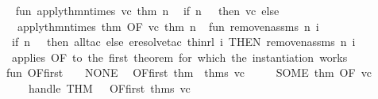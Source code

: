 \begin{isabellebody}
{\isacartoucheclose}\isanewline
\isanewline
{}\isamarkupfalse%
\ {\isacartoucheopen}\isanewline
fun\ apply{\isacharunderscore}{\kern0pt}thm{\isacharunderscore}{\kern0pt}n{\isacharunderscore}{\kern0pt}times\ vc\ thm\ n\ {\isacharequal}{\kern0pt}\isanewline
\ {\isacharparenleft}{\kern0pt}if\ n\ {\isacharless}{\kern0pt}{\isacharequal}{\kern0pt}\ {}\ then\ vc\ else\ \isanewline
\ \ {\isacharparenleft}{\kern0pt}apply{\isacharunderscore}{\kern0pt}thm{\isacharunderscore}{\kern0pt}n{\isacharunderscore}{\kern0pt}times\ {\isacharparenleft}{\kern0pt}thm\ OF\ {\isacharbrackleft}{\kern0pt}vc{\isacharbrackright}{\kern0pt}{\isacharparenright}{\kern0pt}\ thm\ {\isacharparenleft}{\kern0pt}n{\isacharminus}{\kern0pt}{}{\isacharparenright}{\kern0pt}{\isacharparenright}{\kern0pt}\isanewline
\ {\isacharparenright}{\kern0pt}\isanewline
\isanewline
fun\ remove{\isacharunderscore}{\kern0pt}n{\isacharunderscore}{\kern0pt}assms\ n\ i\ {\isacharequal}{\kern0pt}\ \isanewline
\ {\isacharparenleft}{\kern0pt}if\ n\ {\isacharless}{\kern0pt}{\isacharequal}{\kern0pt}\ {}\ then\ all{\isacharunderscore}{\kern0pt}tac\ else\ eresolve{}{\isacharunderscore}{\kern0pt}tac\ {\isacharbrackleft}{\kern0pt}thin{\isacharunderscore}{\kern0pt}rl{\isacharbrackright}{\kern0pt}\ i\ THEN\ remove{\isacharunderscore}{\kern0pt}n{\isacharunderscore}{\kern0pt}assms\ {\isacharparenleft}{\kern0pt}n{\isacharminus}{\kern0pt}{}{\isacharparenright}{\kern0pt}\ i{\isacharparenright}{\kern0pt}\isanewline
\isanewline
{\isacharparenleft}{\kern0pt}{\isacharasterisk}{\kern0pt}\ applies\ {\isachardoublequote}{\kern0pt}OF{\isachardoublequote}{\kern0pt}\ to\ the\ first\ theorem\ for\ which\ the\ instantiation\ works\ {\isacharasterisk}{\kern0pt}{\isacharparenright}{\kern0pt}\isanewline
fun\ OF{\isacharunderscore}{\kern0pt}first\ {\isacharbrackleft}{\kern0pt}{\isacharbrackright}{\kern0pt}\ {\isacharunderscore}{\kern0pt}\ {\isacharequal}{\kern0pt}\ NONE\isanewline
\ {\isacharbar}{\kern0pt}\ OF{\isacharunderscore}{\kern0pt}first\ {\isacharparenleft}{\kern0pt}thm\ {\isacharcolon}{\kern0pt}{\isacharcolon}{\kern0pt}\ thms{\isacharparenright}{\kern0pt}\ vc\ {\isacharequal}{\kern0pt}\isanewline
\ \ \ \ {\isacharparenleft}{\kern0pt}SOME\ {\isacharparenleft}{\kern0pt}thm\ OF\ {\isacharbrackleft}{\kern0pt}vc{\isacharbrackright}{\kern0pt}{\isacharparenright}{\kern0pt}{\isacharparenright}{\kern0pt}\isanewline
\ \ \ \ handle\ THM\ {\isacharunderscore}{\kern0pt}\ {\isacharequal}{\kern0pt}{\isachargreater}{\kern0pt}\ OF{\isacharunderscore}{\kern0pt}first\ thms\ vc\isanewline
{\isacartoucheclose}%
\endisatagML
{\isafoldML}%
%
\isadelimML
\isanewline
%
\endisadelimML
%
\isadelimtheory
\isanewline
%
\endisadelimtheory
%
\isatagtheory
{}\isamarkupfalse%
%
\endisatagtheory
{\isafoldtheory}%
%
\isadelimtheory
%
\endisadelimtheory
%
\end{isabellebody}%
\endinput
